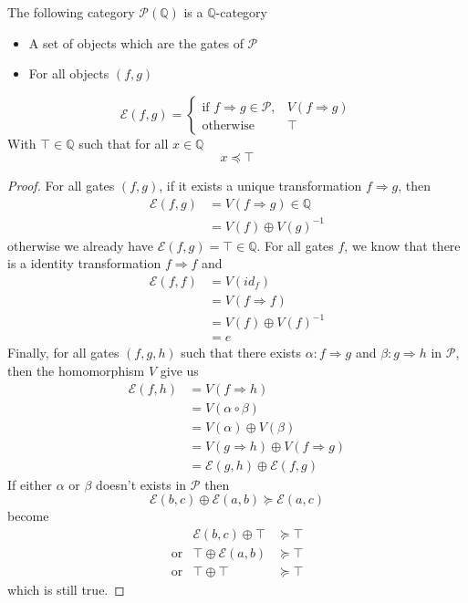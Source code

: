 \documentclass[a4paper]{article}
\begin{document}
\begin{proposition}
  The following category $\mathcal{P}(\mathbb{Q})$ is a $\mathbb{Q}$-category
  \begin{itemize}
    \item A set of objects which are the gates of $\mathcal{P}$
    \item For all objects $(f, g)$
  \end{itemize}
  \[
    \mathcal{E}(f, g) =
    \begin{cases}
      \textrm{if } f \Rightarrow g \in \mathcal{P}, &V(f \Rightarrow g) \\
      \textrm{otherwise } &\top
    \end{cases}
  \]
  With $\top \in \mathbb{Q}$ such that for all $x \in \mathbb{Q}$
  \[
    x \preceq \top
  \]
  
  \begin{proof}
    For all gates $(f, g)$, if it exists a unique transformation $f \Rightarrow
      g$, then
    \begin{align}
      \mathcal{E}(f, g) &= V(f \Rightarrow g) \in \mathbb{Q} \\
      &= V(f) \oplus V(g)^{-1}
    \end{align}
    otherwise we already have $\mathcal{E}(f, g) = \top \in \mathbb{Q}$.
    For all gates $f$, we know that there is a identity transformation $f
      \Rightarrow f$ and
    \begin{align}
      \mathcal{E}(f, f) &= V(id_f) \\
      &= V(f \Rightarrow f)\\
      &= V(f) \oplus V(f)^{-1} \\
      &= e
    \end{align}
    Finally, for all gates $(f, g, h)$ such that there exists $\alpha: f
      \Rightarrow g$ and $\beta: g \Rightarrow h$ in $\mathcal{P}$, then the
      homomorphism $V$ give us
    \begin{align}
      \mathcal{E}(f, h) &= V(f \Rightarrow h) \\
      &= V(\alpha \circ \beta) \\
      &= V(\alpha) \oplus V(\beta) \\
      &= V(g \Rightarrow h) \oplus V(f \Rightarrow g) \\
      &= \mathcal{E}(g, h) \oplus \mathcal{E}(f, g)
    \end{align}
    If either $\alpha$ or $\beta$ doesn't exists in $\mathcal{P}$ then
    \[
      \mathcal{E}(b, c) \oplus \mathcal{E}(a, b) \succeq \mathcal{E}(a, c)
    \]
    become
    \[
      \begin{matrix}
        &\mathcal{E}(b, c) \oplus \top &\succeq \top \\
        \textrm{or} &\top \oplus \mathcal{E}(a, b) &\succeq \top \\
        \textrm{or} &\top \oplus \top &\succeq \top
      \end{matrix}
    \]
    which is still true.
  \end{proof}
\end{proposition}
\end{document}
